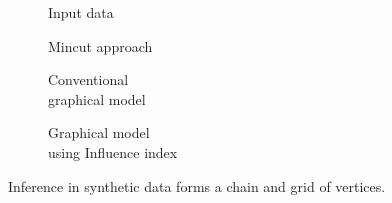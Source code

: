 \begin{figure}[t!]
	\centering
	\captionsetup[subfigure]{justification=centering}
	\begin{subfigure}[b]{0.45\textwidth}
		\centering
		
		\caption{Input data}
		\label{fig4a: synthetic data: chain and grid}
	\end{subfigure}
	\hfill
	\begin{subfigure}[b]{0.45\textwidth}
		\centering
		
		\caption{Mincut approach}
		\label{fig4b: synthetic data: chain and grid}
	\end{subfigure}

	\hfill
	
	\begin{subfigure}[b]{0.45\textwidth}
		\centering
		
		\caption{Conventional \\ graphical model}
		\label{fig4c: synthetic data: chain and grid}
	\end{subfigure}
	\hfill
	\begin{subfigure}[b]{0.45\textwidth}
		\centering
		
		\caption{Graphical model \\ using Influence index}
		\label{fig4d: synthetic data: chain and grid}
	\end{subfigure}

	\caption{Inference in synthetic data forms a chain and grid of vertices.}
	\label{fig4: synthetic data: chain and grid}
\end{figure}

